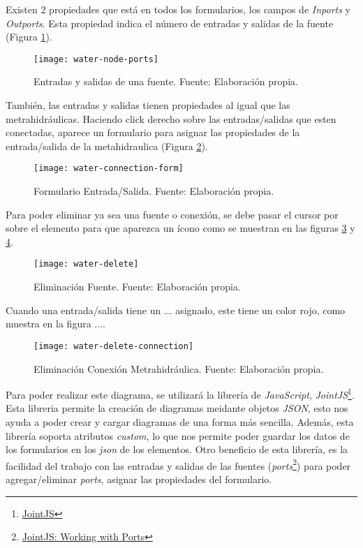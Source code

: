Existen 2 propiedades que está en todos los formularios, los campos de \textit{Inports} y \textit{Outports}. Esta propiedad indica el número de entradas y salidas de la fuente (Figura \ref{fig:water-node-ports}).

\begin{figure}[H]
	\centering
	\texttt{[image: water-node-ports]}
	\caption{\label{fig:water-node-ports} Entradas y salidas de una fuente. Fuente: Elaboración propia.}
\end{figure}

También, las entradas y salidas tienen propiedades al igual que las metrahidráulicas. Haciendo click derecho sobre las entradas/salidas que esten conectadas, aparece un formulario para asignar las propiedades de la entrada/salida de la metahidraulica (Figura \ref{fig:water-conexion-form}).

\begin{figure}[H]
	\centering
	\texttt{[image: water-connection-form]}
	\caption{\label{fig:water-conexion-form} Formulario Entrada/Salida. Fuente: Elaboración propia.}
\end{figure}

Para poder eliminar ya sea una fuente o conexión, se debe pasar el cursor por sobre el elemento para que aparezca un ícono como se muestran en las figuras \ref{fig:water-delete} y \ref{fig:water-delete-connection}.

\begin{figure}[H]
	\centering
	\texttt{[image: water-delete]}
	\caption{\label{fig:water-delete} Eliminación Fuente. Fuente: Elaboración propia.}
\end{figure}

Cuando una entrada/salida tiene un ... asignado, este tiene un color rojo, como muestra en la figura ....

\begin{figure}[H]
	\centering
	\texttt{[image: water-delete-connection]}
	\caption{\label{fig:water-delete-connection} Eliminación Conexión Metrahidráulica. Fuente: Elaboración propia.}
\end{figure}

Para poder realizar este diagrama, se utilizará la librería de \textit{JavaScript}, \textit{JointJS}\footnote{\href{https://www.jointjs.com/}{JointJS}}. 
Esta libreria permite la creación de diagramas meidante objetos \textit{JSON}, esto nos ayuda a poder crear y cargar diagramas de una forma más sencilla. Además, esta librería soporta atributos \textit{custom}, lo que nos permite poder guardar los datos de los formularios en los \textit{json} de los elementos.
Otro beneficio de esta librería, es la facilidad del trabajo con las entradas y salidas de las fuentes (\textit{ports}\footnote{\href{https://resources.jointjs.com/tutorial/ports}{JointJS: Working with Ports}}) para poder agregar/eliminar \textit{ports}, asignar las propiedades del formulario.

